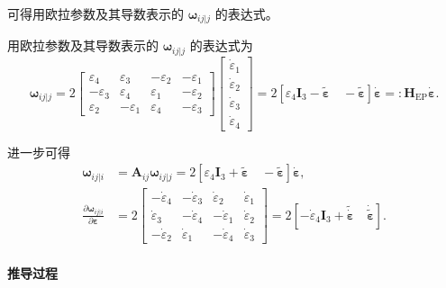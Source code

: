 可得用欧拉参数及其导数表示的 $\bm{\omega}_{ij|j}$ 的表达式。

用欧拉参数及其导数表示的 $\bm{\omega}_{ij|j}$ 的表达式为
\begin{equation}
    \bm{\omega}_{ij|j} = 2\begin{bmatrix}
        \varepsilon_4 & \varepsilon_3 & -\varepsilon_2 & -\varepsilon_1\\
        -\varepsilon_3 & \varepsilon_4 & \varepsilon_1 & -\varepsilon_2\\
        \varepsilon_2 & -\varepsilon_1 & \varepsilon_4 & -\varepsilon_3
    \end{bmatrix}
    \begin{bmatrix}
        \dot{\varepsilon}_1\\
        \dot{\varepsilon}_2\\
        \dot{\varepsilon}_3\\
        \dot{\varepsilon}_4
    \end{bmatrix}
    = 2\left[\varepsilon_4\bm{I}_3 - \tilde{\bm{\varepsilon}}\quad -\tilde{\bm{\varepsilon}}\right]\dot{\bm{\varepsilon}} =: \bm{H}_{\mathrm{EP}}\dot{\bm{\varepsilon}}.
\end{equation}

进一步可得
\begin{align}
    \bm{\omega}_{ij|i} &= \bm{A}_{ij}\bm{\omega}_{ij|j} = 2\left[\varepsilon_4\bm{I}_3 + \tilde{\bm{\varepsilon}}\quad -\tilde{\bm{\varepsilon}}\right]\dot{\bm{\varepsilon}},\\
    \frac{\partial\bm{\omega}_{ij|i}}{\partial\bm{\varepsilon}} &= 2\begin{bmatrix}
        -\dot{\varepsilon}_4 & -\dot{\varepsilon}_3 & \dot{\varepsilon}_2 & \dot{\varepsilon}_1\\
        \dot{\varepsilon}_3 & -\dot{\varepsilon}_4 & -\dot{\varepsilon}_1 & \dot{\varepsilon}_2\\
        -\dot{\varepsilon}_2 & \dot{\varepsilon}_1 & -\dot{\varepsilon}_4 & \dot{\varepsilon}_3
    \end{bmatrix}
    = 2\left[-\dot{\varepsilon}_4\bm{I}_3 + \tilde{\dot{\bm{\varepsilon}}}\quad \dot{\tilde{\bm{\varepsilon}}}\right].
\end{align}

\paragraph*{推导过程}

